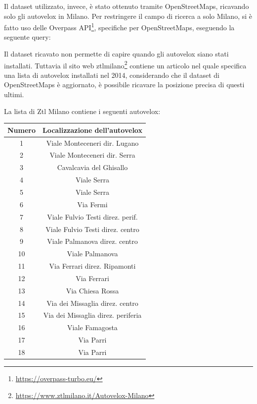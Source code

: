 \documentclass[a4paper]{report}
\begin{document}
Il dataset utilizzato, invece, è stato ottenuto tramite OpenStreetMaps, ricavando solo gli autovelox 
in Milano. 
Per restringere il campo di ricerca a solo Milano, si è fatto uso delle Overpass API\footnote{\url{https://overpass-turbo.eu/}}, 
specifiche per OpenStreetMaps, eseguendo la seguente query: 



Il dataset ricavato non permette di capire quando gli autovelox siano stati installati.
Tuttavia il sito web ztlmilano\footnote{\url{https://www.ztlmilano.it/Autovelox-Milano}} 
contiene un articolo nel quale specifica una lista di 
autovelox installati nel 2014, considerando che il dataset di OpenStreetMaps è aggiornato, 
è possibile ricavare la posizione precisa di questi ultimi.

La lista di Ztl Milano contiene i seguenti autovelox: 

\begin{center}
    \def\arraystretch{1.5}%
    \begin{tabular}{ |c|c| } 
    \hline
    Numero & Localizzazione dell'autovelox \\ 
    \hline
    \rowcolor{TableGray}
    1   &   Viale Monteceneri  dir. Lugano\\
    2   &   Viale Monteceneri dir. Serra\\
    \rowcolor{TableGray}
    3   &   Cavalcavia del Ghisallo\\
    4   &   Viale Serra \\
    \rowcolor{TableGray}
    5   &   Viale Serra\\
    6   &   Via Fermi\\
    \rowcolor{TableGray}
    7   &   Viale Fulvio Testi direz. perif.\\
    8   &   Viale Fulvio Testi direz. centro\\
    \rowcolor{TableGray}
    9   &   Viale Palmanova  direz. centro\\
    10  &   Viale Palmanova\\
    \rowcolor{TableGray}
    11  &   Via Ferrari direz. Ripamonti\\
    12  &   Via Ferrari\\
    \rowcolor{TableGray}
    13  &   Via Chiesa Rossa\\
    14  &   Via dei Missaglia direz. centro\\
    \rowcolor{TableGray}
    15  &   Via dei Missaglia direz. periferia\\
    16  &   Viale Famagosta\\
    \rowcolor{TableGray}
    17  &   Via Parri\\
    18  &   Via Parri\\
    \hline
    \end{tabular}
    \label{ztl-milano}
\end{center}
\end{document}
